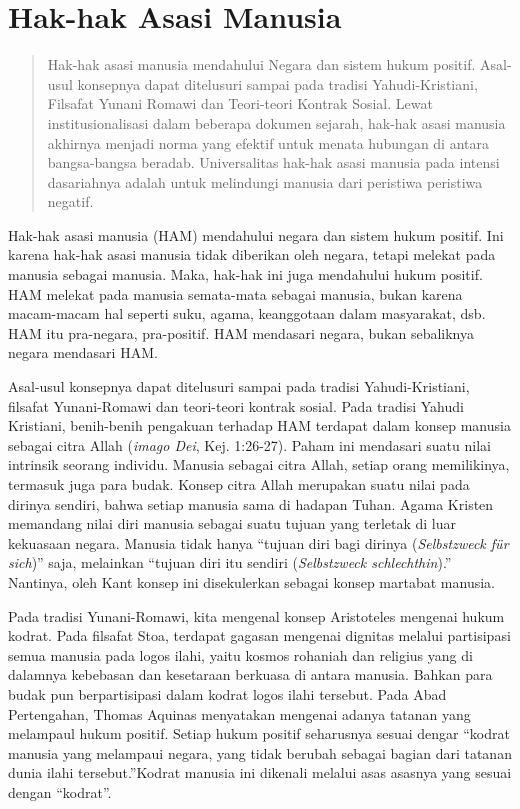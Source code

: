 \documentclass[11pt,twoside,a5paper,openany]{memoir}
\begin{document}
\hypertarget{hak-hak-asasi-manusia}{%
\section{Hak-hak Asasi Manusia}\label{hak-hak-asasi-manusia}}

\begin{quote}
Hak-hak asasi manusia mendahului Negara dan sistem hukum positif.
Asal-usul konsepnya dapat ditelusuri sampai pada tradisi
Yahudi-Kristiani, Filsafat Yunani Romawi dan Teori-teori Kontrak Sosial.
Lewat institusionalisasi dalam beberapa dokumen sejarah, hak-hak asasi
manusia akhirnya menjadi norma yang efektif untuk menata hubungan di
antara bangsa-bangsa beradab. Universalitas hak-hak asasi manusia pada
intensi dasariahnya adalah untuk melindungi manusia dari peristiwa
peristiwa negatif.
\end{quote}

Hak-hak asasi manusia (HAM) mendahului negara dan sistem hukum positif.
Ini karena hak-hak asasi manusia tidak diberikan oleh negara, tetapi
melekat pada manusia sebagai manusia. Maka, hak-hak ini juga mendahului
hukum positif. HAM melekat pada manusia semata-mata sebagai manusia,
bukan karena macam-macam hal seperti suku, agama, keanggotaan dalam
masyarakat, dsb. HAM itu pra-negara, pra-positif. HAM mendasari negara,
bukan sebaliknya negara mendasari HAM.

Asal-usul konsepnya dapat ditelusuri sampai pada tradisi
Yahudi-Kristiani, filsafat Yunani-Romawi dan teori-teori kontrak sosial.
Pada tradisi Yahudi Kristiani, benih-benih pengakuan terhadap HAM
terdapat dalam konsep manusia sebagai citra Allah (\emph{imago Dei},
Kej. 1:26-27). Paham ini mendasari suatu nilai intrinsik seorang
individu. Manusia sebagai citra Allah, setiap orang memilikinya,
termasuk juga para budak. Konsep citra Allah merupakan suatu nilai pada
dirinya sendiri, bahwa setiap manusia sama di hadapan Tuhan. Agama
Kristen memandang nilai diri manusia sebagai suatu tujuan yang terletak
di luar kekuasaan negara. Manusia tidak hanya ``tujuan diri bagi dirinya
(\emph{Selbstzweck für sich})'' saja, melainkan ``tujuan diri itu
sendiri (\emph{Selbstzweck schlechthin}).'' Nantinya, oleh Kant konsep
ini disekulerkan sebagai konsep martabat manusia.

Pada tradisi Yunani-Romawi, kita mengenal konsep Aristoteles mengenai
hukum kodrat. Pada filsafat Stoa, terdapat gagasan mengenai dignitas
melalui partisipasi semua manusia pada logos ilahi, yaitu kosmos
rohaniah dan religius yang di dalamnya kebebasan dan kesetaraan berkuasa
di antara manusia. Bahkan para budak pun berpartisipasi dalam kodrat
logos ilahi tersebut. Pada Abad Pertengahan, Thomas Aquinas menyatakan
mengenai adanya tatanan yang melampaul hukum positif. Setiap hukum
positif seharusnya sesuai dengar ``kodrat manusia yang melampaui negara,
yang tidak berubah sebagai bagian dari tatanan dunia ilahi
tersebut.''Kodrat manusia ini dikenali melalui asas asasnya yang sesuai
dengan ``kodrat''.
\end{document}
